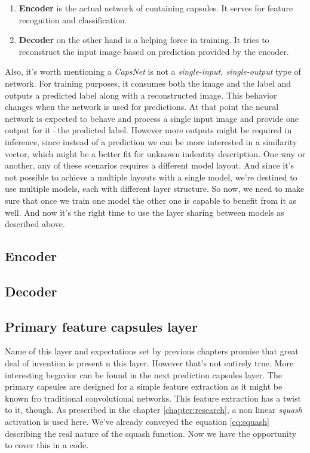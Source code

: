 \begin{enumerate}
    \item \textbf{Encoder} is the actual network of containing capsules. It serves for feature recognition and classification.
    \item \textbf{Decoder} on the other hand is a helping force in training. It tries to reconstruct the input image based on prediction provided by the encoder.
\end{enumerate}

Also, it's worth mentioning a \textit{CapsNet} is not a \textit{single-input, single-output} type of network. For training purposes, it consumes both the image and the label and outputs a predicted label along with a reconstructed image. This behavior changes when the network is used for predictions. At that point the neural network is expected to behave and process a single input image and provide one output for it\,--\,the predicted label. However more outputs might be required in inference, since instead of a prediction we can be more interested in a similarity vector, which might be a better fit for unknown indentity description. One way or another, any of these scenarios requires a different model layout. And since it's not possible to achieve a multiple layouts with a single model, we're destined to use multiple models, each with different layer structure. So now, we need to make sure that once we train one model the other one is capable to benefit from it as well. And now it's the right time to use the layer sharing between models as described above.

\subsection{Encoder}



\subsection{Decoder}



\subsection{Primary feature capsules layer}

Name of this layer and expectations set by previous chapters promise that great deal of invention is present n this layer. However that's not entirely true. More interesting begavior can be found in the next prediction capsules layer. The primary capsules are designed for a simple feature extraction as it might be known fro traditional convolutional networks. This feature extraction has a twist to it, though. As prescribed in the chapter \ref{chapter:research}, a non linear \textit{squash} activation is used here. We've already conveyed the equation \ref{eq:squash} describing the real nature of the squash function. Now we have the opportunity to cover this in a code.

